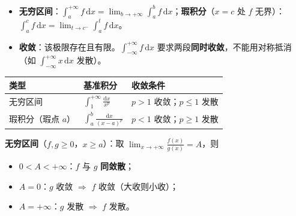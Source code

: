 \documentclass[11pt,a4paper]{ctexart}
\begin{document}

\begin{itemize}

\item \textbf{无穷区间}：$\displaystyle\int_a^{+\infty}f\,\mathrm{d}x=\lim_{b\to+\infty}\int_a^{b}f\,\mathrm{d}x$；\textbf{瑕积分}（$x=c$ 处 $f$ 无界）：$\displaystyle\int_a^{c}f\,\mathrm{d}x=\lim_{t\to c^{-}}\int_a^{t}f\,\mathrm{d}x$。

\item \textbf{收敛}：该极限存在且有限。$\displaystyle\int_{-\infty}^{+\infty}f\,\mathrm{d}x$ 要求两段\textbf{同时收敛}，不能用对称抵消（如 $\displaystyle\int_{-\infty}^{+\infty}x\,\mathrm{d}x$ 发散）。

\end{itemize}



\begin{center}\small
\begin{tabularx}{\linewidth}{@{}>{\raggedright\arraybackslash}X>{\raggedright\arraybackslash}X>{\raggedright\arraybackslash}X@{}}
\toprule
类型 & 基准积分 & 收敛条件 \\
\midrule
无穷区间 & $\displaystyle\int_1^{+\infty}\frac{\mathrm{d}x}{x^{p}}$ & $p>1$ 收敛；$p\le1$ 发散 \\
瑕积分（瑕点 $a$） & $\displaystyle\int_a^{b}\frac{\mathrm{d}x}{(x-a)^{p}}$ & $p<1$ 收敛；$p\ge1$ 发散 \\
\bottomrule
\end{tabularx}
\end{center}



\textbf{无穷区间}（$f,g\ge0$，$x\ge a$）：取 $\displaystyle\lim_{x\to+\infty}\frac{f(x)}{g(x)}=A$，则

\begin{itemize}

\item $0<A<+\infty$：$f$ 与 $g$ \textbf{同敛散}；

\item $A=0$：$g$ 收敛 $\Rightarrow$ $f$ 收敛（大收则小收）；

\item $A=+\infty$：$g$ 发散 $\Rightarrow$ $f$ 发散。

\end{itemize}
\end{document}

